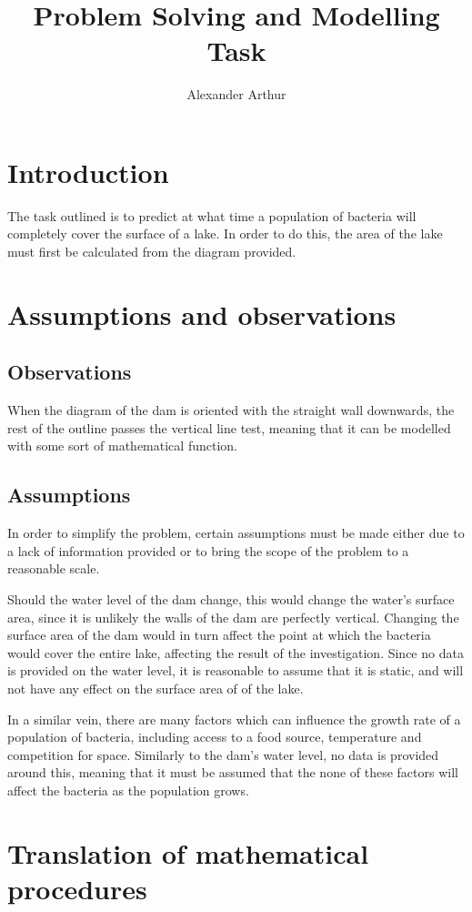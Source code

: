 \documentclass{article}
\title{Problem Solving and Modelling Task}
\author{Alexander Arthur}
\begin{document}
\maketitle
\setcounter{tocdepth}{1}
\tableofcontents



\section{Introduction}
The task outlined is to predict at what time a population of bacteria will
completely cover the surface of a lake. In order to do this, the area of the
lake must first be calculated from the diagram provided.

\section{Assumptions and observations}

    \subsection{Observations}

    When the diagram of the dam is oriented with the straight wall downwards, the rest of the outline passes the vertical line test, meaning that it can be modelled with some sort of mathematical function.
    
    \subsection{Assumptions}
    
    In order to simplify the problem, certain assumptions must be made either due to a lack of information provided or to bring the scope of the problem to a reasonable scale.

    Should the water level of the dam change, this would change the water's surface area, since it is unlikely the walls of the dam are perfectly vertical. Changing the surface area of the dam would in turn affect the point at which the bacteria would cover the entire lake, affecting the result of the investigation. Since no data is provided on the water level, it is reasonable to assume that it is static, and will not have any effect on the surface area of of the lake.

    In a similar vein, there are many factors which can influence the growth rate of a population of bacteria, including access to a food source, temperature and competition for space. Similarly to the dam's water level, no data is provided around this, meaning that it must be assumed that the none of these factors will affect the bacteria as the population grows.
    
\section{Translation of mathematical procedures}
\end{document}
